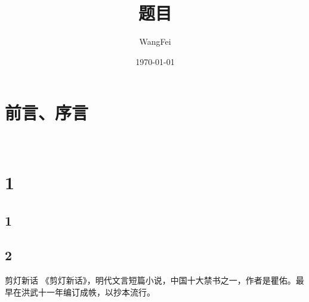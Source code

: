 \documentclass[12pt,UTF8]{ctexbook}
\title{\heiti\zihao{0} 题目}
\author{WangFei}
\date{\today}
\begin{document}
\maketitle
\tableofcontents

\frontmatter
\chapter{前言、序言}

\mainmatter

~\\

 \qquad  

\chapter{1}
\section{1}
\section{2}
剪灯新话
《剪灯新话》，明代文言短篇小说，中国十大禁书之一，作者是瞿佑。最早在洪武十一年编订成帙，以抄本流行。\\
\end{document}
